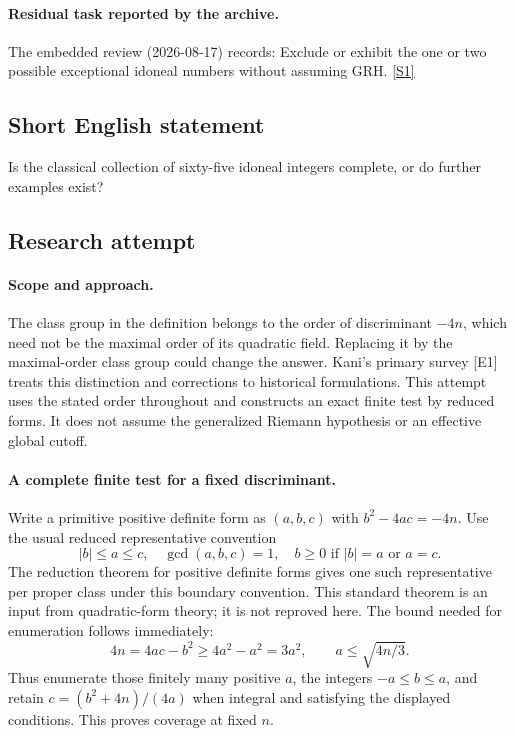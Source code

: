 \documentclass[11pt,a4paper]{article}
\newcommand{\sref}[2]{\hyperlink{source:#1:#2}{[S#2]}}
\begin{document}
\paragraph{Residual task reported by the archive.}

The embedded review (2026-08-17) records: Exclude or exhibit the one or two possible exceptional idoneal numbers without assuming GRH. \sref{1252}{1}

\subsection{Short English statement}

Is the classical collection of sixty-five idoneal integers complete, or do further examples exist?

\subsection{Research attempt}

\paragraph{Scope and approach.}
The class group in the definition belongs to the order of discriminant
$-4n$, which need not be the maximal order of its quadratic field.
Replacing it by the maximal-order class group could change the answer.
Kani's primary survey [E1] treats this distinction and corrections to
historical formulations. This attempt uses the stated order throughout
and constructs an exact finite test by reduced forms. It does not assume
the generalized Riemann hypothesis or an effective global cutoff.

\paragraph{A complete finite test for a fixed discriminant.}
Write a primitive positive definite form as $(a,b,c)$ with
$b^2-4ac=-4n$. Use the usual reduced representative convention
\[
 |b|\le a\le c,\quad \gcd(a,b,c)=1,
 \quad b\ge0\text{ if }|b|=a\text{ or }a=c.
\]
The reduction theorem for positive definite forms gives one such
representative per proper class under this boundary convention. This
standard theorem is an input from quadratic-form theory; it is not
reproved here. The bound needed for enumeration follows immediately:
\[
 4n=4ac-b^2\ge4a^2-a^2=3a^2,
 \qquad a\le\sqrt{4n/3}.
\]
Thus enumerate those finitely many positive $a$, the integers
$-a\le b\le a$, and retain $c=(b^2+4n)/(4a)$ when integral and
satisfying the displayed conditions. This proves coverage at fixed $n$.
\end{document}
